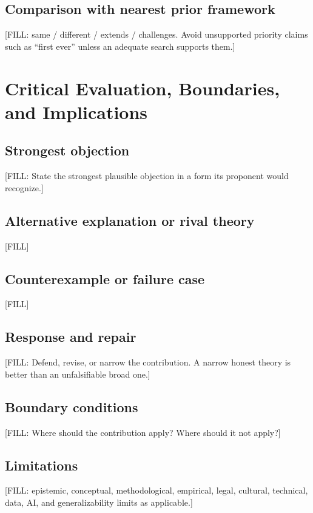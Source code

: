 \documentclass[11pt]{article}
\begin{document}
\subsection{Comparison with nearest prior framework}
[FILL: same / different / extends / challenges. Avoid unsupported priority
claims such as ``first ever'' unless an adequate search supports them.]


\section{Critical Evaluation, Boundaries, and Implications}
\label{sec:s6}


\subsection{Strongest objection}
[FILL: State the strongest plausible objection in a form its proponent would
recognize.]

\subsection{Alternative explanation or rival theory}
[FILL]

\subsection{Counterexample or failure case}
[FILL]

\subsection{Response and repair}
[FILL: Defend, revise, or narrow the contribution. A narrow honest theory is
better than an unfalsifiable broad one.]

\subsection{Boundary conditions}
[FILL: Where should the contribution apply? Where should it not apply?]

\subsection{Limitations}
[FILL: epistemic, conceptual, methodological, empirical, legal, cultural,
technical, data, AI, and generalizability limits as applicable.]
\end{document}
